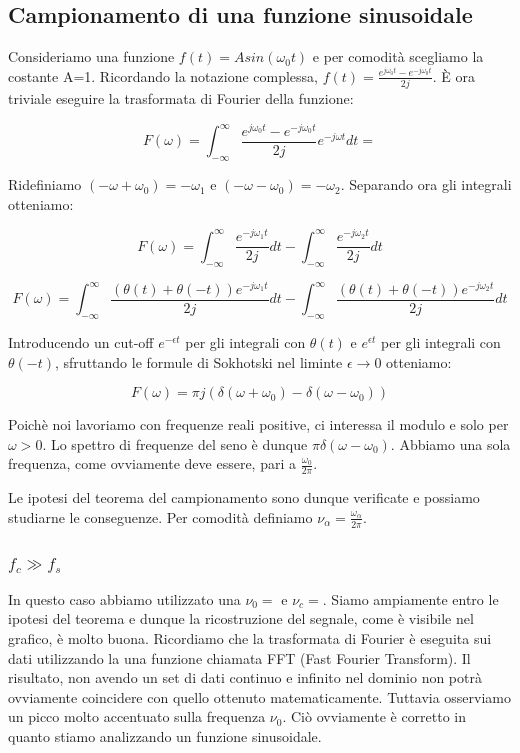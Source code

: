 \subsection{Campionamento di una funzione sinusoidale}

Consideriamo una funzione $f(t)=Asin(\omega_0 t)$ e per comodità scegliamo la costante A=1. Ricordando la notazione complessa, $f(t)=\frac{e^{j\omega_0 t}-e^{-j\omega_0 t}}{2j}$. È ora triviale eseguire la trasformata di Fourier della funzione:

$$F(\omega)=\int_{-\infty}^{\infty} \frac{e^{j\omega_0 t}-e^{-j\omega_0 t}}{2j}e^{-j\omega t} dt=$$

Ridefiniamo $(-\omega + \omega_0)=-\omega_1$ e $(-\omega - \omega_0)=-\omega_2$. Separando ora gli integrali otteniamo:

$$F(\omega)=\int_{-\infty}^{\infty} \frac{e^{-j\omega_1 t}}{2j}dt - \int_{-\infty}^{\infty} \frac{e^{-j\omega_2 t}}{2j}dt$$

$$F(\omega)=\int_{-\infty}^{\infty} \frac{(\theta(t)+\theta(-t)) e^{-j\omega_1 t}}{2j}dt - \int_{-\infty}^{\infty} \frac{(\theta(t)+\theta(-t))e^{-j\omega_2 t}}{2j}dt$$


Introducendo un cut-off $e^{-\epsilon t}$ per gli integrali con $\theta(t)$ e $e^{\epsilon t}$ per gli integrali con $\theta(-t)$, sfruttando le formule di Sokhotski nel liminte $\epsilon \rightarrow 0$ otteniamo:

$$F(\omega)=\pi j (\delta(\omega + \omega_0) - \delta(\omega - \omega_0))$$

Poichè noi lavoriamo con frequenze reali positive, ci interessa il modulo e solo per $\omega > 0$. Lo spettro di frequenze del seno è dunque $\pi \delta(\omega-\omega_0)$. Abbiamo una sola frequenza, come ovviamente deve essere, pari a $\frac{\omega_0}{2\pi}$. 

Le ipotesi del teorema del campionamento sono dunque verificate e possiamo studiarne le conseguenze. Per comodità definiamo $\nu_{\alpha}=\frac{\omega_{\alpha}}{2\pi}$.


\subsubsection{$f_c \gg f_s$}

In questo caso abbiamo utilizzato una $\nu_0=$ e $\nu_c=$. Siamo ampiamente entro le ipotesi del teorema e dunque la ricostruzione del segnale, come è visibile nel grafico, è molto buona. Ricordiamo che la trasformata di Fourier è eseguita sui dati utilizzando la una funzione chiamata FFT (Fast Fourier Transform). Il risultato, non avendo un set di dati continuo e infinito nel dominio non potrà ovviamente coincidere con quello ottenuto matematicamente. Tuttavia osserviamo un picco molto accentuato sulla frequenza $\nu_0$. Ciò ovviamente è corretto in quanto stiamo analizzando un funzione sinusoidale.




